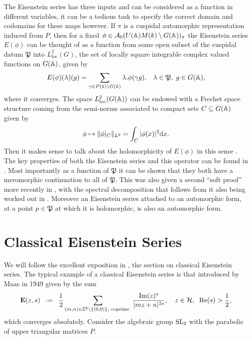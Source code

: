 The Eisenstein series has three inputs and can be considered as a function in different variables, it can be a tedious task to specify the correct domain and codomains for these maps however. If \(\pi\) is a cuspidal automorphic representation induced from \(P\), then for a fixed \(\phi \in\mathcal{A}_0(U(\A)M(k)\setminus G(\A))_\pi \) the Eisenstein series \(E(\phi)\) can be thought of as a function from some open subset of the cuspidal datum \(\mathfrak{P}\) into \(L^2_{\mathrm{loc}}(G)\), the set of locally square integrable complex valued functions on \(G(\A)\), given by 
\[E(\phi)(\lambda)(g) = \sum_{\gamma \in P(k)\backslash G(k)} \lambda.\phi(\gamma g), \;\;\; \lambda\in \mathfrak{P},\; g\in G(\A),\]
where it converges. The space \(L^2_{\mathrm{loc}}(G(\A))\) can be endowed with a Frechet space structure coming from the semi-norms associated to compact sets \(C\subseteq G(\A)\) given by 
\[\phi \mapsto \norm{\phi|_C}_{L^2} = \int_C |\phi(x)|^2 \mathrm{d}x.\] 
Then it makes sense to talk about the holomorphicity of \(E(\phi)\) in this sense \cite[I.4.9]{moeglinSpectralDecompositionEisenstein1995}. The key properties of both the Eisenstein series and this operator can be found in \cite[IV.1.8, IV.1.9, IV.1.10, IV.1.11]{moeglinSpectralDecompositionEisenstein1995}. Most importantly as a function of \(\mathfrak{P}\) it can be shown that they both have a meromorphic continuation to all of \(\mathfrak{P}\). This was also given a second ``soft proof'' more recently in \cite{bernsteinMeromorphicContinuationEisenstein2022}, with the spectral decomposition that follows from it also being worked out in \cite{delormeSpectralTheoremLanglands2021}. Moreover an Eisenstein series attached to an automorphic form, at a point \(p\in \mathfrak{P}\) at which it is holomorphic, is also an automorphic form. 

\section{Classical Eisenstein Series}\label{sec:classic-eisenstein}

We will follow the excellent exposition in \cite{garrettTransitionEisensteinSeries2016}, the section \cite[1.2]{bruinier123ModularForms2008} on classical Eisenstein series. The typical example of a classical Eisenstein series is that introduced by Maas in 1949 \cite{lapidPerspectivesEisensteinSeries2022}  given by the sum 
\[\mathbf{E}(z, s) \defeq \frac{1}{2} \sum_{(m,n)\in \Z^2\setminus \{(0,0)\}, \text{ coprime }} \frac{\mathrm{Im}(z)^{s}}{|mz+n|^{2s}}, \quad z\in \mathcal{H},\;\; \mathrm{Re}(s)>\frac{1}{2},\]
which converges absolutely. Consider the algebraic group \(\operatorname{SL}_2\) with the parabolic of upper triangular matrices \(P\).

